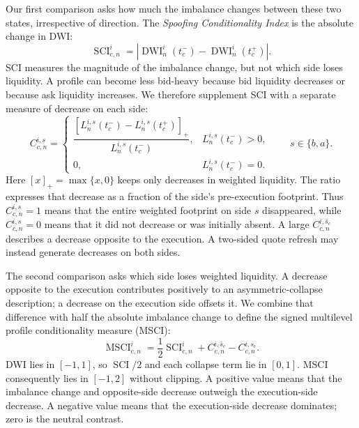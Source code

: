 \documentclass[11pt]{article}
\begin{document}
Our first comparison asks how much the imbalance changes between these two states, irrespective of direction. The \textit{Spoofing Conditionality Index} is the absolute change in DWI:
\begin{equation}
    \operatorname{SCI}^{i}_{c,n}
    =
    \left|
        \operatorname{DWI}^{i}_{n}(t_c^{-})
        -
        \operatorname{DWI}^{i}_{n}(t_c^{+})
    \right|.
    \label{eq:topn_sci}
\end{equation}
SCI measures the magnitude of the imbalance change, but not which side loses liquidity. A profile can become less bid-heavy because bid liquidity decreases or because ask liquidity increases. We therefore supplement SCI with a separate measure of decrease on each side:
\begin{equation}
    C^{i,s}_{c,n}
    =\begin{cases}
    \dfrac{
        \left[
            L^{i,s}_{n}(t_c^{-})-L^{i,s}_{n}(t_c^{+})
        \right]_{+}
    }{
        L^{i,s}_{n}(t_c^{-})
    },
    & L^{i,s}_{n}(t_c^{-})>0,\\
    0,
    & L^{i,s}_{n}(t_c^{-})=0.
    \end{cases}
    \qquad s\in\{b,a\}.
    \label{eq:side_collapse}
\end{equation}
Here $[x]_{+}=\max\{x,0\}$ keeps only decreases in weighted liquidity. The ratio expresses that decrease as a fraction of the side's pre-execution footprint. Thus $C^{i,s}_{c,n}=1$ means that the entire weighted footprint on side $s$ disappeared, while $C^{i,s}_{c,n}=0$ means that it did not decrease or was initially absent. A large $C^{i,\bar{s}_c}_{c,n}$ describes a decrease opposite to the execution. A two-sided quote refresh may instead generate decreases on both sides.

The second comparison asks which side loses weighted liquidity. A decrease opposite to the execution contributes positively to an asymmetric-collapse description; a decrease on the execution side offsets it. We combine that difference with half the absolute imbalance change to define the signed multilevel profile conditionality measure (MSCI):
\begin{equation}
    \operatorname{MSCI}^{i}_{c,n}
    =\frac{1}{2}\operatorname{SCI}^{i}_{c,n}
     +C^{i,\bar{s}_c}_{c,n}
     -C^{i,s_c}_{c,n}.
    \label{eq:signed_msci}
\end{equation}
DWI lies in $[-1,1]$, so $\operatorname{SCI}/2$ and each collapse term lie in $[0,1]$. MSCI consequently lies in $[-1,2]$ without clipping. A positive value means that the imbalance change and opposite-side decrease outweigh the execution-side decrease. A negative value means that the execution-side decrease dominates; zero is the neutral contrast.
\end{document}
